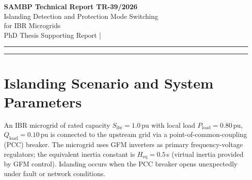 \documentclass[11pt,a4paper]{article}
\begin{document}
\begin{center}
  {\LARGE\bfseries\color{sambpblue} SAMBP Technical Report TR-39/2026}\\[6pt]
  {\large Islanding Detection and Protection Mode Switching\\
    for IBR Microgrids}\\[10pt]
  {\normalsize PhD Thesis Supporting Report \quad|}
\end{center}

\vspace{2pt}\hrule\vspace{8pt}

\begin{abstract}
\noindent
This report develops an islanding detection and protection mode switching
framework for an IBR microgrid with very low equivalent inertia
($H_\mathrm{eq}=0.5$\,s).  Passive detection via ROCOF ($\geq1$\,Hz/s) detects
islanding for all power mismatches $|\Delta P|\geq0.02$\,pu within 100\,ms; the
residual non-detection zone (NDZ) of $\pm2\%$ rated power is reduced to $\pm1.2\%$
by active reactive-power injection.  On islanding confirmation, the protection
system switches mode within 20\,ms: distance relay Zone~1/2 and 87L are disabled,
overcurrent elements are rescaled to islanded fault levels, and GFM inverters
assume voltage/frequency regulation.  Resynchronisation is supervised by relay
25 (sync-check) with settings $\Delta V\leq0.05$\,pu, $\Delta f\leq0.10$\,Hz,
$\Delta\theta\leq10^\circ$.  The combined framework provides seamless transition
between grid-connected and islanded protection without any manual relay
reconfiguration.
\end{abstract}

\vspace{4pt}\hrule\vspace{10pt}

\section{Islanding Scenario and System Parameters}
\label{sec:scenario}

An IBR microgrid of rated capacity $S_\mathrm{ibr}=1.0$\,pu with local load
$P_\mathrm{load}=0.80$\,pu, $Q_\mathrm{load}=0.10$\,pu is connected to the
upstream grid via a point-of-common-coupling (PCC) breaker.  The microgrid
uses GFM inverters as primary frequency-voltage regulators; the equivalent
inertia constant is $H_\mathrm{eq}=0.5$\,s (virtual inertia provided by GFM
control).  Islanding occurs when the PCC breaker opens unexpectedly under fault
or network conditions.
\end{document}
